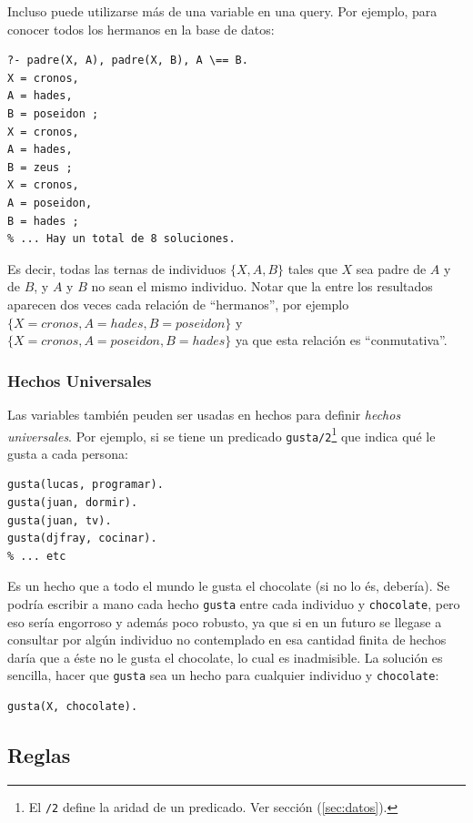 \documentclass[12pt,titlepage]{article}
\begin{document}
Incluso puede utilizarse más de una variable en una query. Por ejemplo, para conocer todos los hermanos en la base de datos:
\begin{lstlisting}[label=lst:queryhermanos]
% El \== el operador 'distinto'
?- padre(X, A), padre(X, B), A \== B.
X = cronos,
A = hades,
B = poseidon ;
X = cronos,
A = hades,
B = zeus ;
X = cronos,
A = poseidon,
B = hades ;
% ... Hay un total de 8 soluciones.
\end{lstlisting}

Es decir, todas las ternas de individuos $\{X,A,B\}$ tales que $X$ sea padre de $A$ y de $B$, y $A$ y $B$ no sean el mismo individuo. Notar que la entre los resultados aparecen dos veces cada relación de ``hermanos'', por ejemplo $\{X=cronos,A=hades,B=poseidon\}$ y $\{X=cronos,A=poseidon,B=hades\}$ ya que esta relación es ``conmutativa''.

\subsubsection*{Hechos Universales}

Las variables también peuden ser usadas en hechos para definir \emph{hechos universales}. Por ejemplo, si se tiene un predicado \lstinline|gusta/2|\footnote{El \lstinline|/2| define la aridad de un predicado. Ver sección (\ref{sec:datos}).} que indica qué le gusta a cada persona:
\begin{lstlisting}
gusta(lucas, programar).
gusta(juan, dormir).
gusta(juan, tv).
gusta(djfray, cocinar).
% ... etc
\end{lstlisting}

Es un hecho que a todo el mundo le gusta el chocolate (si no lo és, debería). Se podría escribir a mano cada hecho \lstinline|gusta| entre cada individuo y \lstinline|chocolate|, pero eso sería engorroso y además poco robusto, ya que si en un futuro se llegase a consultar por algún individuo no contemplado en esa cantidad finita de hechos daría que a éste no le gusta el chocolate, lo cual es inadmisible. La solución es sencilla, hacer que \lstinline|gusta| sea un hecho para cualquier individuo y \lstinline|chocolate|:
\begin{lstlisting}
gusta(X, chocolate).
\end{lstlisting}

\subsection{Reglas}
\label{sec:reglas}
\end{document}
